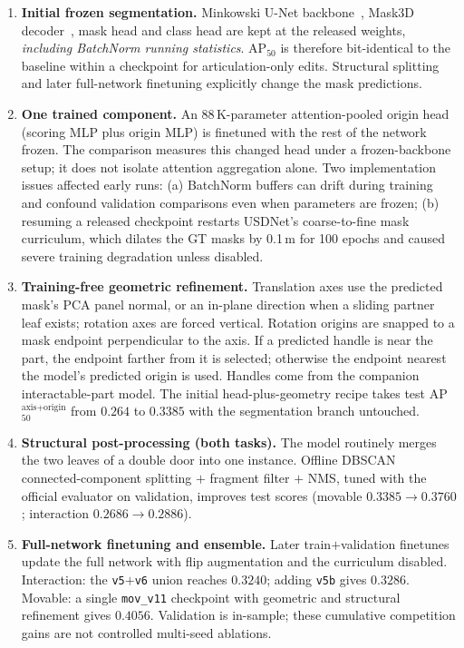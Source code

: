 \documentclass[11pt]{article}
\newcommand{\metric}{AP$_{50}^{\text{axis+origin}}$}
\newcommand{\apfifty}{AP$_{50}$}
\begin{document}
\begingroup\small
\begin{enumerate}[leftmargin=*]
\item \textbf{Initial frozen segmentation.} Minkowski U-Net backbone~\cite{choy2019minkowski}, Mask3D decoder~\cite{schult2023mask3d}, mask head and class head are kept at the released weights, \emph{including BatchNorm running statistics}. \apfifty{} is therefore bit-identical to the baseline within a checkpoint for articulation-only edits. Structural splitting and later full-network finetuning explicitly change the mask predictions.
\item \textbf{One trained component.} An 88\,K-parameter attention-pooled origin head (scoring MLP plus origin MLP) is finetuned with the rest of the network frozen. The comparison measures this changed head under a frozen-backbone setup; it does not isolate attention aggregation alone. Two implementation issues affected early runs: (a) BatchNorm buffers can drift during training and confound validation comparisons even when parameters are frozen; (b) resuming a released checkpoint restarts USDNet's coarse-to-fine mask curriculum, which dilates the GT masks by 0.1\,m for 100 epochs and caused severe training degradation unless disabled.
\item \textbf{Training-free geometric refinement.} Translation axes use the predicted mask's PCA panel normal, or an in-plane direction when a sliding partner leaf exists; rotation axes are forced vertical. Rotation origins are snapped to a mask endpoint perpendicular to the axis. If a predicted handle is near the part, the endpoint farther from it is selected; otherwise the endpoint nearest the model's predicted origin is used. Handles come from the companion interactable-part model. The initial head-plus-geometry recipe takes test \metric{} from $0.264$ to $0.3385$ with the segmentation branch untouched.
\item \textbf{Structural post-processing (both tasks).} The model routinely merges the two leaves of a double door into one instance. Offline DBSCAN~\cite{ester1996dbscan} connected-component splitting $+$ fragment filter $+$ NMS, tuned with the official evaluator on validation, improves test scores (movable $0.3385\!\to\!0.3760$; interaction $0.2686\!\to\!0.2886$).
\item \textbf{Full-network finetuning and ensemble.} Later train$+$validation finetunes update the full network with flip augmentation and the curriculum disabled. Interaction: the \texttt{v5}$+$\texttt{v6} union reaches $0.3240$; adding \texttt{v5b} gives $0.3286$. Movable: a single \texttt{mov\_v11} checkpoint with geometric and structural refinement gives $0.4056$. Validation is in-sample; these cumulative competition gains are not controlled multi-seed ablations.
\end{enumerate}
\endgroup
\end{document}
